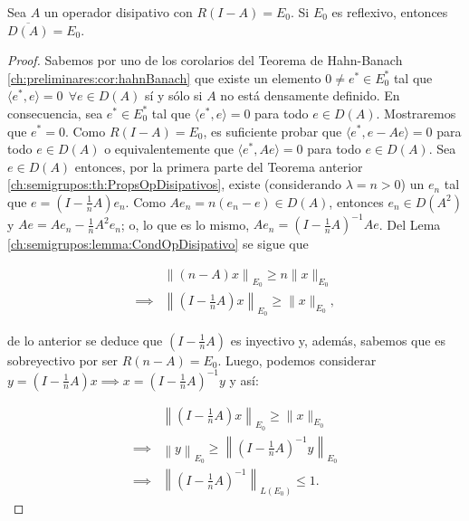 \begin{Teorema}
    \label{ch:semigrupos:th:DisipYReflex}

    Sea $A$ un operador disipativo con $R(I - A) = E_0$. Si $E_0$ es reflexivo\footnotemark, entonces $\overline{D(A)} = E_0$.
\end{Teorema}
\footnotetext{\textcolor{red}{PONER DEF DE ESPACIO REFLEX}}
\begin{proof}
    Sabemos por uno de los corolarios del Teorema de Hahn-Banach \ref{ch:preliminares:cor:hahnBanach} que existe un elemento $0 \neq e^* \in E^*_0$ tal que $\langle e^*, e\rangle = 0 \ \ \forall e \in D(A)$ sí y sólo si $A$ no está densamente definido. En consecuencia, sea $e^* \in E_0^*$ tal que $\langle e^*, e \rangle = 0$ para todo $e \in D(A)$. Mostraremos que $e^* = 0$. Como $R(I- A) = E_0$, es suficiente probar que $\langle e^*, e - Ae \rangle = 0$ para todo $e \in D(A)$ o equivalentemente que $\langle e^*, Ae \rangle = 0$ para todo $e \in D(A)$. Sea $e \in D(A)$ entonces, por la primera parte del Teorema anterior \ref{ch:semigrupos:th:PropsOpDisipativos}, existe (considerando $\lambda = n > 0$) un $e_n$ tal que $e = (I - \frac{1}{n}A)e_n$. Como $Ae_n = n(e_n - e) \in D(A)$, entonces $e_n \in D(A^2)$ y $Ae = Ae_n - \frac{1}{n}A^2e_n$; o, lo que es lo mismo, $Ae_n = (I - \frac{1}{n}A)^{-1}Ae$. Del Lema \ref{ch:semigrupos:lemma:CondOpDisipativo} se sigue que 

    \begin{align*}
        &\left \lVert \left (n - A \right ) x\right \rVert_{E_0} \geq n \lVert x \rVert_{E_0}\\
        \implies& \left \lVert \left (I - \frac{1}{n}A \right ) x\right \rVert_{E_0} \geq \lVert x \rVert_{E_0},
    \end{align*}

    de lo anterior se deduce que $(I - \frac{1}{n}A)$ es inyectivo y, además, sabemos que es sobreyectivo por ser $R(n - A) = E_0$. Luego, podemos considerar $y = (I - \frac{1}{n}A)x \implies x = (I-\frac{1}{n}A)^{-1}y$ y así:

    \begin{align*}
        &\left \lVert \left (I - \frac{1}{n}A \right ) x\right \rVert_{E_0} \geq \lVert x \rVert_{E_0}\\
        \implies& \left \lVert y \right \rVert_{E_0} \geq \left \lVert \left (I - \frac{1}{n}A \right )^{-1} y\right \rVert_{E_0}\\
        \implies& \left \lVert \left (I - \frac{1}{n}A \right )^{-1}\right \rVert_{L(E_0)} \leq 1.
    \end{align*}    


\end{proof}

